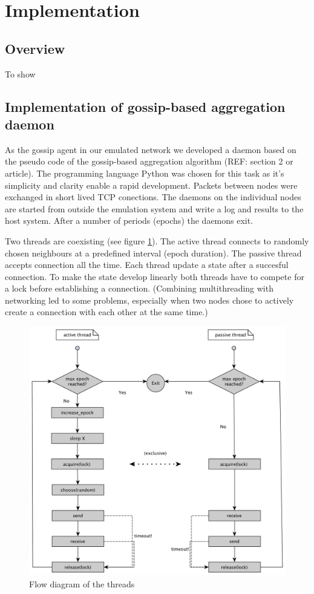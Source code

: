 \section{Implementation}
\label{sec:implementation}
\subsection{Overview}
To show

\subsection{Implementation of gossip-based aggregation daemon}
As the gossip agent in our emulated network we developed a daemon based on the pseudo code of the gossip-based aggregation algorithm (REF: section 2 or article). The programming language Python \cite{python} was chosen for this task as it's simplicity and clarity enable a rapid development. Packets between nodes were exchanged in short lived TCP conections. The daemons on the individual nodes are started from outside the emulation system and write a log and results to the host system. After a number of periods (epochs) the daemons exit.

Two threads are coexisting (see figure \ref{fig:flow_diag}). The active thread connects to randomly chosen neighbours at a predefined interval (epoch duration). The passive thread accepts connection all the time. Each thread update a state after a succesful connection. To make the state develop linearly both threads have to compete for a lock before establishing a connection. (Combining multithreading with networking led to some problems, especially when two nodes chose to actively create a connection with each other at the same time.)
\begin{figure}[h!]
    \begin{center}
        \includegraphics[scale=0.25]{flow_diag.jpg}
    \end{center}
    \caption{Flow diagram of the threads}
    \label{fig:flow_diag}
\end{figure}

